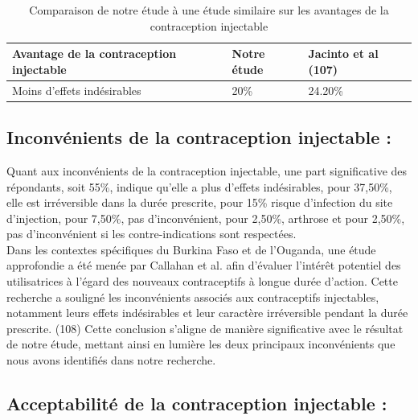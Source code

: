 \begin{table}[H]
  \centering
  \renewcommand{\arraystretch}{1.5}

  \begin{spacing}{1.5} %
  \begin{tabularx}{\textwidth}{|p{6cm}|X|X|}
      \hline
      \textbf{Avantage de la contraception injectable} & \textbf{Notre étude } & \textbf{Jacinto et al (107)} \\
      \hline
      Moins d’effets indésirables & 20\% & 24.20\%  \\
      
      
      \hline
  \end{tabularx}
\end{spacing}
\captionsetup{justification=centering} %
\caption{Comparaison de notre étude à une étude similaire sur les avantages de la contraception injectable}

\end{table}

\subsection{Inconvénients de la contraception injectable :}

Quant aux inconvénients de la contraception injectable, une part significative des répondants, soit 55\%, indique qu’elle a plus d’effets indésirables, pour 37,50\%, elle est irréversible dans la durée prescrite, pour 15\% risque d’infection du site d’injection, pour 7,50\%, pas d’inconvénient, pour 2,50\%, arthrose et pour 2,50\%, pas d’inconvénient si les contre-indications sont respectées. \\

\noindent Dans les contextes spécifiques du Burkina Faso et de l'Ouganda, une étude approfondie a été menée par Callahan et al. afin d'évaluer l'intérêt potentiel des utilisatrices à l'égard des nouveaux contraceptifs à longue durée d'action. Cette recherche a souligné les inconvénients associés aux contraceptifs injectables, notamment leurs effets indésirables et leur caractère irréversible pendant la durée prescrite. (108) Cette conclusion s'aligne de manière significative avec le résultat de notre étude, mettant ainsi en lumière les deux principaux inconvénients que nous avons identifiés dans notre recherche.

\subsection{Acceptabilité de la contraception injectable : }

